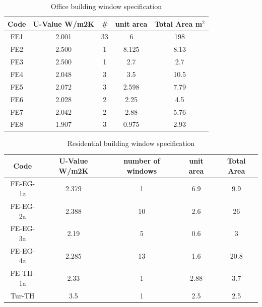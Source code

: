 \documentclass[11pt, a4paper]{article}
\theoremstyle{definition}
\begin{document}
			
				\begin{table}[H]
				\centering
				\caption{Office building window specification}
			    \begin{tabular}{ccccc}
			    	\toprule
				    \multicolumn{1}{p{3em}}{Code} & \multicolumn{1}{p{3.785em}}{U-Value W/m2K} & \multicolumn{1}{p{4.215em}}{\#} & \multicolumn{1}{p{4.215em}}{unit area} & \multicolumn{1}{p{4em}}{Total Area m$^2$} \\
				    \midrule
				    \multicolumn{1}{c}{FE1} & 2.001 & 33   & 6    & 198 \\
				    \midrule
				    \multicolumn{1}{c}{FE2} & 2.500 & 1    & 8.125 & 8.13 \\
				    \midrule
				    \multicolumn{1}{c}{FE3} & 2.500 & 1    & 2.7  & 2.7 \\
				    \midrule
				    FE4  & 2.048 & 3    & 3.5  & 10.5 \\
				    \midrule
				    FE5  & 2.072 & 3    & 2.598 & 7.79 \\
				    \midrule
				    FE6  & 2.028 & 2    & 2.25 & 4.5 \\
				    \midrule
				    FE7  & 2.042 & 2    & 2.88 & 5.76 \\
				    \midrule
				    FE8  & 1.907 & 3    & 0.975 & 2.93 \\
				    \bottomrule
			    \end{tabular}%
				\label{tab:SumatraWindow}%
				\end{table}%

				\begin{table}[H]
				\centering
				\caption{Residential building window specification}
				    \begin{tabular}{ccccc}
				    \toprule
				    \multicolumn{1}{p{4.215em}}{Code} & \multicolumn{1}{p{5.145em}}{U-Value W/m2K} & \multicolumn{1}{p{5.145em}}{number of windows} & \multicolumn{1}{p{4.43em}}{unit area} & \multicolumn{1}{p{5.145em}}{Total Area} \\
				    \midrule
				    FE-EG-1a & 2.379 & 1    & 6.9  & 9.9 \\
				    \midrule
				    FE-EG-2a & 2.388 & 10   & 2.6  & 26 \\
				    \midrule
				    FE-EG-3a & 2.19 & 5    & 0.6  & 3 \\
				    \midrule
				    FE-EG-4a & 2.285 & 13   & 1.6  & 20.8 \\
				    \midrule
				    FE-TH-1a & 2.33 & 1    & 2.88 & 3.7 \\
				    \midrule
				    Tur-TH & 3.5  & 1    & 2.5  & 2.5 \\
				    \bottomrule
				    \end{tabular}%
				\label{tab:HonggWindow}%
				\end{table}%
\end{document}
